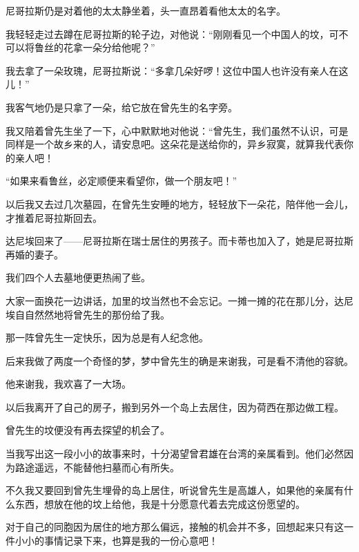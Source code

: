 \par 尼哥拉斯仍是对着他的太太静坐着，头一直昂着看他太太的名字。
\par 我轻轻走过去蹲在尼哥拉斯的轮子边，对他说：“刚刚看见一个中国人的坟，可不可以将鲁丝的花拿一朵分给他呢？”
\par 我去拿了一朵玫瑰，尼哥拉斯说：“多拿几朵好啰！这位中国人也许没有亲人在这儿！”
\par 我客气地仍是只拿了一朵，给它放在曾先生的名字旁。
\par 我又陪着曾先生坐了一下，心中默默地对他说：“曾先生，我们虽然不认识，可是同样是一个故乡来的人，请安息吧。这朵花是送给你的，异乡寂寞，就算我代表你的亲人吧！
\par “如果来看鲁丝，必定顺便来看望你，做一个朋友吧！”
\par 以后我又去过几次墓园，在曾先生安睡的地方，轻轻放下一朵花，陪伴他一会儿，才推着尼哥拉斯回去。
\par 达尼埃回来了——尼哥拉斯在瑞士居住的男孩子。而卡蒂也加入了，她是尼哥拉斯再婚的妻子。
\par 我们四个人去墓地便更热闹了些。
\par 大家一面换花一边讲话，加里的坟当然也不会忘记。一摊一摊的花在那儿分，达尼埃自自然然地将曾先生的那份给了我。
\par 那一阵曾先生一定快乐，因为总是有人纪念他。
\par 后来我做了两度一个奇怪的梦，梦中曾先生的确是来谢我，可是看不清他的容貌。
\par 他来谢我，我欢喜了一大场。
\par 以后我离开了自己的房子，搬到另外一个岛上去居住，因为荷西在那边做工程。
\par 曾先生的坟便没有再去探望的机会了。
\par 当我写出这一段小小的故事来时，十分渴望曾君雄在台湾的亲属看到。他们必然因为路途遥远，不能替他扫墓而心有所失。
\par 不久我又要回到曾先生埋骨的岛上居住，听说曾先生是高雄人，如果他的亲属有什么东西，想放在他的坟上给他，我是十分愿意代着去完成这份愿望的。
\par 对于自己的同胞因为居住的地方那么偏远，接触的机会并不多，回想起来只有这一件小小的事情记录下来，也算是我的一份心意吧！

